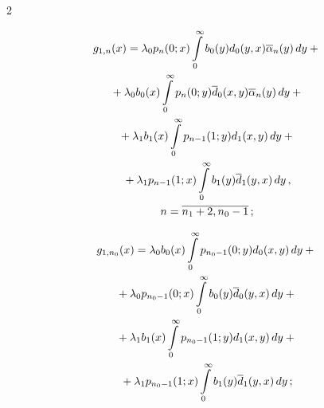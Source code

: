 \begin{multicols}{2}
\noindent


\begin{multline*}


g_{1,n}(x) = \lambda_0 p_{n}(0;x) \int\limits_0^\infty b_0(y) d_0(y,x) \oa_n(y)\, dy


+{}\\


{}+ \lambda_0 b_0(x) \int\limits_0^\infty p_{n}(0;y) \d_0(x,y) \oa_n(y)\, dy


+ {}\\


{}+ \lambda_1 b_1(x) \int\limits_0^\infty p_{n-1}(1;y) d_1(x,y)\, dy+{}\\


{}+


\lambda_1 p_{n-1}(1;x) \int\limits_0^\infty b_1(y) \d_1(y,x)\, dy\,,


\\ n=\overline{n_1+2,n_0-1}\,;


\end{multline*}







\vspace*{-24pt}





\noindent


\begin{multline*}


g_{1,n_0}(x) = \lambda_0 b_0(x)\int\limits_0^\infty p_{n_0-1}(0;y) d_0(x,y)\, dy


+{}\\


{}+


\lambda_0 p_{n_0-1}(0;x) \int\limits_0^\infty b_0(y) \d_0(y,x)\, dy+{}


\\


{}+ \lambda_1 b_1(x) \int\limits_0^\infty p_{n_0-1}(1;y) d_1(x,y)\, dy+{}\\


{}+


\lambda_1 p_{n_0-1}(1;x) \int\limits_0^\infty b_1(y) \d_1(y,x)\, dy \,;


\end{multline*}








\end{multicols}
